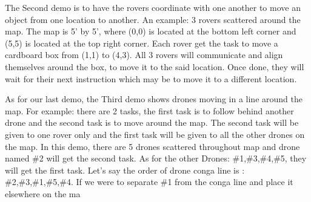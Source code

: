 The Second demo is to have the rovers coordinate with one another to move an object from one location to another. An example: 3 rovers scattered around the map. The map is 5’ by 5’, where (0,0) is located at the bottom left corner and (5,5) is located at the top right corner. Each rover get the task to move a cardboard box from (1,1) to (4,3). All 3 rovers will communicate and align themselves around the box, to move it to the said location. Once done, they will wait for their next instruction which may be to move it to a different location.

As for our last demo, the Third demo shows drones moving in a line around the map. For example: there are 2 tasks, the first task is to follow behind another drone and the second task is to move around the map. The second task will be given to one rover only and the first task will be given to all the other drones on the map. In this demo, there are 5 drones scattered throughout map and drone named \#2 will get the second task. As for the other Drones: \#1,\#3,\#4,\#5, they will get the first task. Let’s say the order of drone conga line is : \#2,\#3,\#1,\#5,\#4. If we were to separate \#1 from the conga line and place it elsewhere on the ma